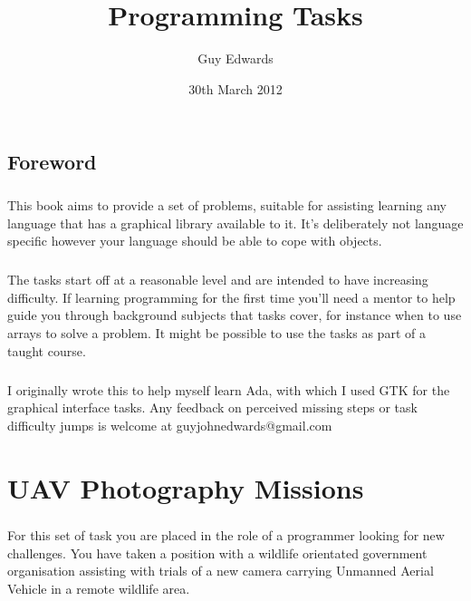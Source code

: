 \documentclass[11pt]{book}
\title{\textbf{Programming Tasks}}
\author{Guy Edwards}
\date{30th March 2012}
\begin{document}
\maketitle

\section{Foreword}

\paragraph{} This book aims to provide a set of problems, suitable for assisting learning any language that has a graphical library available to it. It's deliberately not language specific however your language should be able to cope with objects.

\paragraph{} The tasks start off at a reasonable level and are intended to have increasing difficulty. If learning programming for the first time you'll need a mentor to help guide you through background subjects that tasks cover, for instance when to use arrays to solve a problem. It might be possible to use the tasks as part of a taught course.

\paragraph{} I originally wrote this to help myself learn Ada, with which I used GTK for the graphical interface tasks. Any feedback on perceived missing steps or task difficulty jumps is welcome at guyjohnedwards@gmail.com



\tableofcontents




\chapter{UAV Photography Missions}

\paragraph{} For this set of task you are placed in the role of a programmer looking for new challenges. You have taken a position with a wildlife orientated government organisation assisting with trials of a new camera carrying Unmanned Aerial Vehicle in a remote wildlife area.
\end{document}
